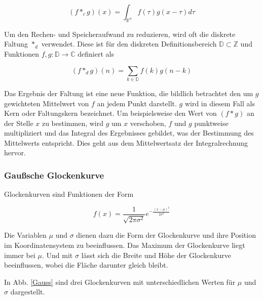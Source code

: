 \documentclass[a4paper,fontsize=12pt,toc=bib,halfparskip]{scrartcl}
\begin{document}
\begin{equation}
(f*_cg)(x) = \int_{\mathbb{R}^n} f(\tau)g(x-\tau)d\tau
\end{equation}

Um den Rechen- und Speicheraufwand zu reduzieren, wird oft die diskrete Faltung $*_d$ verwendet. Diese ist f\"ur den diskreten Definitionsbereich $\mathbb{D} \subset \mathbb{Z}$ und Funktionen $f,g:\mathbb{D}\rightarrow\mathbb{C}$ definiert als

\begin{equation}
(f*_dg)(n) = \sum_{k\in\mathbb{D}}f(k)g(n-k)
\end{equation}

Das Ergebnis der Faltung ist eine neue Funktion, die bildlich betrachtet den um $g$ gewichteten Mittelwert von $f$ an jedem Punkt darstellt. $g$ wird in diesem Fall als Kern oder Faltungskern bezeichnet. Um beispielsweise den Wert von $(f*g)$ an der Stelle $x$ zu bestimmen, wird $g$ um $x$ verschoben, $f$ und $g$ punktweise multipliziert und das Integral des Ergebnisses gebildet, was der Bestimmung des Mittelwerts entspricht. Dies geht aus dem Mittelwertsatz der Integralrechnung hervor.

\subsubsection{Gau{\ss}sche Glockenkurve}
Glockenkurven sind Funktionen der Form 

\begin{equation}
f(x) = \frac{1}{\sqrt{2\pi \sigma^2}}e^{-\frac{(x-\mu)^2}{2\sigma^2}}
\end{equation}

Die Variablen $\mu$ und $\sigma$ dienen dazu die Form der Glockenkurve und ihre Position im Koordinatensystem zu beeinflussen. Das Maximum der Glockenkurve liegt immer bei $\mu$. Und mit $\sigma$ l\"asst sich die Breite und H\"ohe der Glockenkurve beeinflussen, wobei die Fl\"ache darunter gleich bleibt.

In Abb. \ref{Gauss} sind drei Glockenkurven mit unterschiedlichen Werten f\"ur $\mu$ und $\sigma$ dargestellt.

\end{document}
